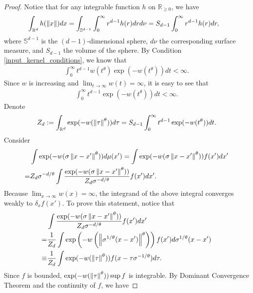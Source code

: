 \begin{proof}
    Notice that for any integrable function $h$ on $\mathbb{R}_{\geq 0}$, we have
    \begin{align}
         & \int_{\mathbb{R}^d} h(\left\lVert x\right\rVert) dx = \int_{\mathbb{S}^{d-1}} \int_0^{\infty} r^{d-1}h(r) dr d\nu=S_{d-1} \int_0^{\infty} r^{d-1}h(r) dr,
    \end{align}
    where $\mathbb{S}^{d-1}$ is the $(d-1)$-dimensional sphere, $d\nu$ the corresponding surface measure, and $S_{d-1}$ the volume of the sphere. By Condition \ref{input_kernel_conditions}, we know that
    \begin{align}
        \int_0^{\infty} t^{d-1} w(t^{\theta}) \exp(-w(t^{\theta}))dt < \infty.
    \end{align}
    Since $w$ is increasing and $\lim_{t \to \infty} w(t) = \infty$, it is easy to see that
    \begin{align}
        \int_0^{\infty} t^{d-1} \exp(-w(t^{\theta}))dt < \infty.
    \end{align}
    Denote
    \begin{align}
        Z_d :=\int_{\mathbb{R}^d}\exp(-w(\left\lVert\tau\right\rVert^{\theta})) d \tau = S_{d-1} \int_0^{\infty} t^{d-1}\exp(-w(t^{\theta})) dt.
    \end{align}
    Consider
    \begin{align}
          & \int \exp(-w(\sigma\left\lVert x-x'\right\rVert^{\theta}))d\mu(x') = \int \exp(-w(\sigma\left\lVert x-x'\right\rVert^{\theta})) f(x')dx' \nonumber \\
        = & Z_d \sigma^{-d/\theta}\int \frac{\exp(-w(\sigma\left\lVert x-x'\right\rVert^{\theta}))}{Z_d \sigma^{-d/\theta}} f(x')dx'.
    \end{align}
    Because $\lim_{x \to \infty} w(x) = \infty$, the integrand of the above integral converges weakly to $\delta_x f(x')$. To prove this statement, notice that
    \begin{align}
               & \int \frac{\exp(-w(\sigma\left\lVert x-x'\right\rVert^{\theta}))}{Z_d \sigma^{-d/\theta}} f(x')dx' \nonumber                                          \\
        =      & \frac{1}{Z_d} \int \exp\left(-w \left(\left\lVert\sigma^{1/\theta}(x-x')\right\rVert^{\theta}\right)\right) f(x') d\sigma^{1/\theta}(x-x') \nonumber \\
        \equiv & \frac{1}{Z_d} \int \exp(-w(\left\lVert\tau\right\rVert^{\theta})) f(x-\tau \sigma^{-1/\theta}) d\tau.
    \end{align}
    Since $f$ is bounded, $\exp(-w(\left\lVert\tau\right\rVert^{\theta})) \sup f$ is integrable. By Dominant Convergence Theorem and the continuity of $f$, we have

\end{proof}
